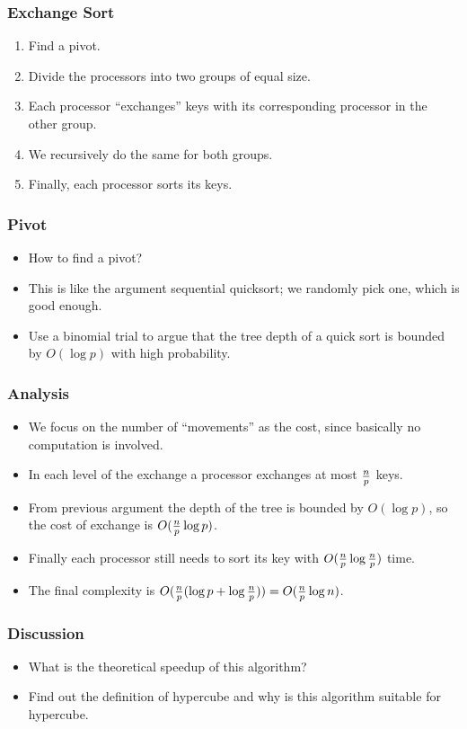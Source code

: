 \documentclass{beamer}
\begin{document}
\begin{CJK}{UTF8}{bsmi}
\begin{frame}
\frametitle{Exchange Sort}
\begin{enumerate}
\item Find a pivot.
\item Divide the processors into two groups of equal size.
\item Each processor ``exchanges'' keys with its corresponding
  processor in the other group.
\item We recursively do the same for both groups.  
\item Finally, each processor sorts its keys.
\end{enumerate}
\end{frame}

\begin{frame}
\frametitle{Pivot}
\begin{itemize}
\item How to find a pivot?
\item This is like the argument sequential quicksort; we randomly pick one, which is good enough.
\item Use a binomial trial to argue that the tree depth of a quick
  sort is bounded by $O(\log p)$ with high probability.
\end{itemize}
\end{frame}

\begin{frame}
\frametitle{Analysis}
\begin{itemize}
\item We focus on the number of ``movements'' as the cost, since
  basically no computation is involved.
\item In each level of the exchange a processor exchanges at most ${n
  \over p}$ keys.
\item From previous argument the depth of the tree is bounded by
  $O(\log p)$, so the cost of exchange is $O( {n \over p} \log p)$.
\item Finally each processor still needs to sort its key with $O({n
  \over p} \log {n \over p})$ time.
\item The final complexity is $O({n \over p} (\log p + \log {n \over
  p})) = O({n \over p} \log n)$.
\end{itemize}
\end{frame}

\begin{frame}
\frametitle{Discussion}
\begin{itemize}
\item What is the theoretical speedup of this algorithm?
\item Find out the definition of hypercube and why is this algorithm
  suitable for hypercube.
\end{itemize}
\end{frame}



\end{CJK}
\end{document}

